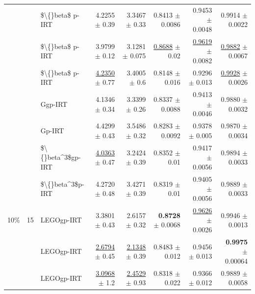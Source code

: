 \begin{longtable}{llp{}rrrrr}
 &  & \$\textbackslash\{\}beta\$ p-IRT & 4.2255 {\scriptsize $\pm$ 0.39} & 3.3467 {\scriptsize $\pm$ 0.33} & 0.8413 {\scriptsize $\pm$ 0.0086} & 0.9453 {\scriptsize $\pm$ 0.0048} & 0.9914 {\scriptsize $\pm$ 0.0022} \\
 &  & \$\textbackslash\{\}beta\$ p-IRT & 3.9799 {\scriptsize $\pm$ 0.12} & 3.1281 {\scriptsize $\pm$ 0.075} & \underline{0.8688} {\scriptsize $\pm$ 0.02} & \underline{0.9619} {\scriptsize $\pm$ 0.0082} & \underline{0.9882} {\scriptsize $\pm$ 0.0067} \\
 &  & \$\textbackslash\{\}beta\$ p-IRT & \underline{4.2350} {\scriptsize $\pm$ 0.77} & 3.4005 {\scriptsize $\pm$ 0.6} & 0.8148 {\scriptsize $\pm$ 0.016} & 0.9296 {\scriptsize $\pm$ 0.013} & \underline{0.9928} {\scriptsize $\pm$ 0.0026} \\
 &  & Ggp-IRT & 4.1346 {\scriptsize $\pm$ 0.34} & 3.3399 {\scriptsize $\pm$ 0.26} & 0.8337 {\scriptsize $\pm$ 0.0088} & 0.9413 {\scriptsize $\pm$ 0.0046} & 0.9880 {\scriptsize $\pm$ 0.0032} \\
 &  & Gp-IRT & 4.4299 {\scriptsize $\pm$ 0.43} & 3.5486 {\scriptsize $\pm$ 0.32} & 0.8283 {\scriptsize $\pm$ 0.0092} & 0.9378 {\scriptsize $\pm$ 0.005} & 0.9870 {\scriptsize $\pm$ 0.0034} \\
 &  & \$\textbackslash\{\}beta\textasciicircum{}3\$gp-IRT & \underline{4.0363} {\scriptsize $\pm$ 0.47} & 3.2424 {\scriptsize $\pm$ 0.39} & 0.8352 {\scriptsize $\pm$ 0.01} & 0.9417 {\scriptsize $\pm$ 0.0056} & 0.9894 {\scriptsize $\pm$ 0.0033} \\
 &  & \$\textbackslash\{\}beta\textasciicircum{}3\$p-IRT & 4.2720 {\scriptsize $\pm$ 0.48} & 3.4271 {\scriptsize $\pm$ 0.39} & 0.8319 {\scriptsize $\pm$ 0.01} & 0.9405 {\scriptsize $\pm$ 0.0056} & 0.9889 {\scriptsize $\pm$ 0.0033} \\
\midrule
10\% & 15 & LEGOgp-IRT & 3.3801 {\scriptsize $\pm$ 0.43} & 2.6157 {\scriptsize $\pm$ 0.32} & \textbf{0.8728} {\scriptsize $\pm$ 0.0068} & \underline{0.9626} {\scriptsize $\pm$ 0.0026} & 0.9946 {\scriptsize $\pm$ 0.0013} \\
 &  & LEGOgp-IRT & \underline{2.6794} {\scriptsize $\pm$ 0.45} & \underline{2.1348} {\scriptsize $\pm$ 0.39} & 0.8483 {\scriptsize $\pm$ 0.012} & 0.9456 {\scriptsize $\pm$ 0.013} & \textbf{0.9975} {\scriptsize $\pm$ 0.00064} \\
 &  & LEGOgp-IRT & \underline{3.0968} {\scriptsize $\pm$ 1.2} & \underline{2.4529} {\scriptsize $\pm$ 0.93} & 0.8318 {\scriptsize $\pm$ 0.022} & 0.9366 {\scriptsize $\pm$ 0.012} & 0.9889 {\scriptsize $\pm$ 0.0058} \\

\end{longtable}
